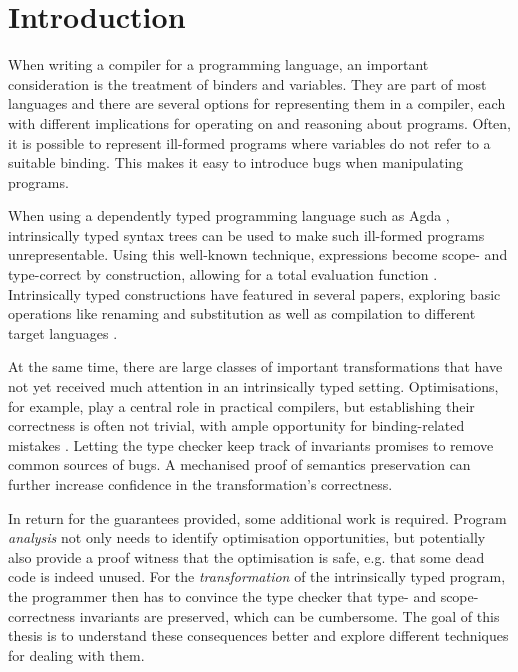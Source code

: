 \chapter{Introduction}
\label{ch:introduction}
    When writing a compiler for a programming language,
    an important consideration is the treatment of binders and variables.
    They are part of most languages and
    there are several options for representing them in a compiler,
    each with different implications for operating on and reasoning about programs.
    Often, it is possible to represent ill-formed programs
    where variables do not refer to a suitable binding.
    This makes it easy to introduce bugs when manipulating programs.

    When using a dependently typed programming language such as Agda
    \cite{Norell2008Agda},
    intrinsically typed syntax trees can be used to
    make such ill-formed programs unrepresentable.
    Using this well-known technique,
    expressions become scope- and type-correct by construction,
    allowing for a total evaluation function
    \cite{Augustsson1999WellTypedInterpreter}.
    Intrinsically typed constructions have featured in several papers,
    exploring basic operations like renaming and substitution
    \cite{Allais2018UniverseOfSyntaxes}
    as well as compilation to different target languages
    \cite[online supplementary material]{Pickard2021CalculatingDependentlyTypedCompilers}.

    At the same time, there are large classes of important transformations
    that have not yet received much attention in an intrinsically typed setting.
    Optimisations, for example, play a central role in practical compilers,
    but establishing their correctness is often not trivial,
    with ample opportunity for binding-related mistakes
    \cite{SpectorZabusky2019EmbracingFormalizationGap}
    \cite{Maclaurin2022Foil}.
    Letting the type checker keep track of invariants
    promises to remove common sources of bugs.
    A mechanised proof of semantics preservation can further increase
    confidence in the transformation's correctness.

    In return for the guarantees provided, some additional work is required.
    Program \emph{analysis} not only needs to identify optimisation opportunities,
    but potentially also provide a proof witness that the optimisation is safe,
    e.g. that some dead code is indeed unused.
    For the \emph{transformation} of the intrinsically typed program,
    the programmer then has to convince the type checker
    that type- and scope-correctness invariants are preserved,
    which can be cumbersome.
    The goal of this thesis is to understand these consequences better
    and explore different techniques for dealing with them.

